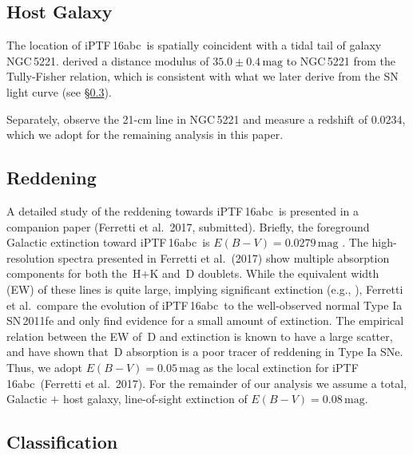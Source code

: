 \documentclass[twocolumn]{aastex61}
\newcommand{\abc}{iPTF\,16abc}
\begin{document}
\subsection{Host Galaxy}
\label{sec:host}

The location of \abc\ is spatially coincident with a tidal tail of
galaxy NGC\,5221. \citet{2007A&A...465...71T} derived a distance
modulus of $35.0\pm0.4\,\textrm{mag}$ to NGC\,5221 from the 
Tully-Fisher relation, which is consistent with what we later derive from the SN light curve (see \S\ref{sec:classification}).

Separately, \citet{2015MNRAS.447.1531C} observe the 21-cm line in
NGC\,5221 and measure a redshift of $0.0234$, which we adopt for the remaining analysis in this paper.

\subsection{Reddening}
\label{sec:reddening}

A detailed study of the reddening towards \abc\ is presented in a 
companion paper (Ferretti et al.\ 2017, submitted). Briefly, the 
foreground Galactic extinction toward \abc\
is $E(B-V) = 0.0279 \, \mathrm{mag}$ \citep{2011ApJ...737..103S}. The high-resolution spectra presented in Ferretti et al.\ (2017) show multiple absorption components for both the \,H$+$K and \,D doublets. While the equivalent width (EW) of these lines is quite large, implying significant extinction (e.g., \citealt{2012MNRAS.426.1465P}), Ferretti et al.\ compare the evolution of \abc\ to the well-observed normal Type Ia SN\,2011fe and only find evidence for a small amount of extinction. The empirical relation between the EW of \,D and extinction is known to have a large scatter, and \citet{2013ApJ...779...38P} have shown that \,D absorption is a poor tracer of reddening in Type Ia SNe. Thus, we adopt $E(B-V) = 0.05 \, \mathrm{mag}$ as the local extinction for \abc\ (Ferretti et al.\ 2017). For the remainder of our analysis we assume a total, Galactic $+$ host galaxy, line-of-sight extinction of $E(B-V) = 0.08 \, \mathrm{mag}$.

\subsection{Classification}
\label{sec:classification}
\end{document}
